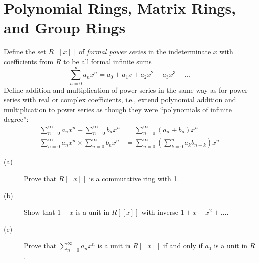 \documentclass[12pt,leqno]{book}
\numberwithin{equation}{section}
\newcommand{\question}[2] {\vspace{.25in}\noindent\fbox{#1} #2 \vspace{.10in}}
\theoremstyle{definition}
\begin{document}
\section{Polynomial Rings, Matrix Rings, and Group Rings}

\question{3}{Define the set $R[[x]]$ of \textit{formal power series} in the indeterminate $x$ with coefficients from $R$ to be all formal infinite sums \[\sum_{n=0}^{\infty}a_nx^n=a_0+a_1x+a_2x^2+a_3x^3+\hdots\] Define addition and multiplication of power series in the same way as for power series with real or complex coefficients, i.e., extend polynomial addition and multiplication to power series as though they were ``polynomials of infinite degree'':\begin{align*}\sum_{n=0}^{\infty}a_nx^n+\sum_{n=0}^{\infty}b_nx^n&=\sum_{n=0}^{\infty}(a_n+b_n)x^n\\\sum_{n=0}^{\infty}a_nx^n\times\sum_{n=0}^{\infty}b_nx^n&=\sum_{n=0}^{\infty}\left(\sum_{k=0}^na_kb_{n-k}\right)x^n\end{align*}}
\begin{description}
 \item [(a)] Prove that $R[[x]]$ is a commutative ring with 1.
 \item [(b)] Show that $1-x$ is a unit in $R[[x]]$ with inverse $1+x+x^2+\hdots$.
 \item [(c)] Prove that $\sum_{n=0}^{\infty}a_nx^n$ is a unit in $R[[x]]$ if and only if $a_0$ is a unit in $R$.
\end{description}
\end{document}
